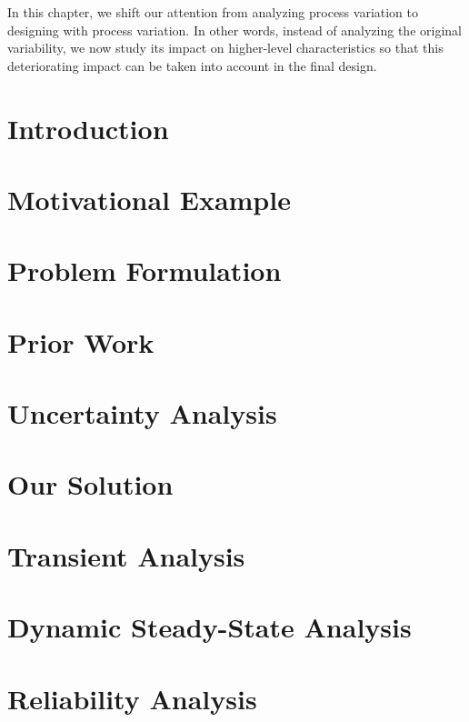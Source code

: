 In this chapter, we shift our attention from analyzing process variation to
designing with process variation. In other words, instead of analyzing the
original variability, we now study its impact on higher-level characteristics so
that this deteriorating impact can be taken into account in the final design.

\section{Introduction}

\section{Motivational Example}

\section{Problem Formulation}

\section{Prior Work}

\section{Uncertainty Analysis}

\section{Our Solution}

\section{Transient Analysis}

\section{Dynamic Steady-State Analysis}

\section{Reliability Analysis}

